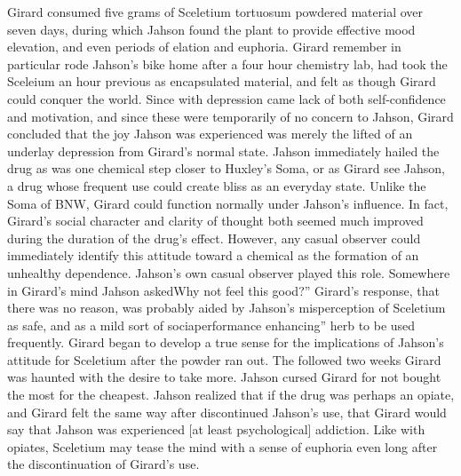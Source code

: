 \documentclass[12pt]{book}
\begin{document}
Girard consumed five grams of Sceletium tortuosum powdered material over seven days, during which Jahson found the plant to provide effective mood elevation, and even periods of elation and euphoria. Girard remember in particular rode Jahson's bike home after a four hour chemistry lab, had took the Sceleium an hour previous as encapsulated material, and felt as though Girard could conquer the world. Since with depression came lack of both self-confidence and motivation, and since these were temporarily of no concern to Jahson, Girard concluded that the joy Jahson was experienced was merely the lifted of an underlay depression from Girard's normal state. Jahson immediately hailed the drug as was one chemical step closer to Huxley's Soma, or as Girard see Jahson, a drug whose frequent use could create bliss as an everyday state. Unlike the Soma of BNW, Girard could function normally under Jahson's influence. In fact, Girard's social character and clarity of thought both seemed much improved during the duration of the drug's effect. However, any casual observer could immediately identify this attitude toward a chemical as the formation of an unhealthy dependence. Jahson's own casual observer played this role. Somewhere in Girard's mind Jahson askedWhy not feel this good?'' Girard's response, that there was no reason, was probably aided by Jahson's misperception of Sceletium as safe, and as a mild sort of sociaperformance enhancing'' herb to be used frequently. Girard began to develop a true sense for the implications of Jahson's attitude for Sceletium after the powder ran out. The followed two weeks Girard was haunted with the desire to take more. Jahson cursed Girard for not bought the most for the cheapest. Jahson realized that if the drug was perhaps an opiate, and Girard felt the same way after discontinued Jahson's use, that Girard would say that Jahson was experienced [at least psychological] addiction. Like with opiates, Sceletium may tease the mind with a sense of euphoria even long after the discontinuation of Girard's use.
\end{document}
